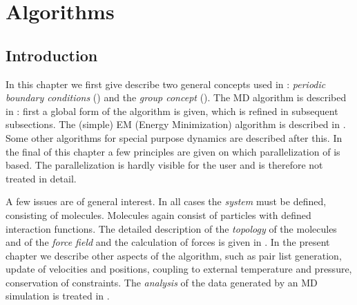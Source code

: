 %
% 
% 
% 
% 
% 
% 
% 
% 
%

\newcommand{\nproc}{\mbox{$M$}}
\newcommand{\natom}{\mbox{$N$}}
\newcommand{\nx}{\mbox{$n_x$}}
\newcommand{\ny}{\mbox{$n_y$}}
\newcommand{\nz}{\mbox{$n_z$}}
\newcommand{\nsgrid}{NS grid}
\newcommand{\fftgrid}{FFT grid}
\newcommand{\dgrid}{\mbox{$\delta_{grid}$}}
\chapter{Algorithms}
\label{ch:algorithms}
\section{Introduction}
In this chapter we first give describe two general concepts used in
{\gromacs}:  {\em periodic boundary conditions} ()
and the {\em group concept} (). The MD algorithm is
described in : first a global form of the algorithm is
given, which is refined in subsequent subsections. The (simple) EM
(Energy Minimization) algorithm is described in . Some
other algorithms for special purpose dynamics are described after
this.  In the final  of this chapter a few principles are
given on which parallelization of {\gromacs} is based. The
parallelization is hardly visible for the user and is therefore not
treated in detail.

A few issues are of general interest. In all cases the {\em system}
must be defined, consisting of molecules. Molecules again consist of
particles  with defined interaction functions. The detailed
description of the {\em topology} of the molecules and of the {\em force
field} and the calculation of forces is given in
. In the present chapter we describe
other aspects of the algorithm, such as pair list generation, update of
velocities  and positions, coupling to external temperature and
pressure,  conservation of constraints. The {\em analysis} of the data
generated by an MD simulation is treated in .


